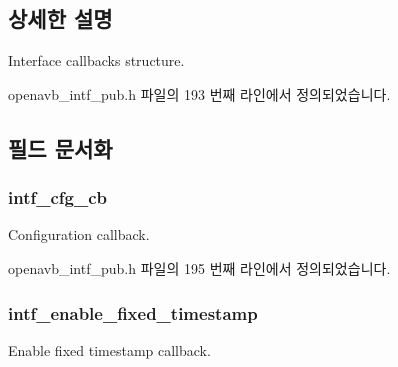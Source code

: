 \subsection{상세한 설명}
Interface callbacks structure. 

openavb\+\_\+intf\+\_\+pub.\+h 파일의 193 번째 라인에서 정의되었습니다.



\subsection{필드 문서화}
\subsubsection[{\texorpdfstring{intf\+\_\+cfg\+\_\+cb}{intf_cfg_cb}}]{ intf\+\_\+cfg\+\_\+cb}\hypertarget{structopenavb__intf__cb__t_ac399da5e32ebb5e311f3c2fefc7c53e2}{}\label{structopenavb__intf__cb__t_ac399da5e32ebb5e311f3c2fefc7c53e2}


Configuration callback. 



openavb\+\_\+intf\+\_\+pub.\+h 파일의 195 번째 라인에서 정의되었습니다.

\subsubsection[{\texorpdfstring{intf\+\_\+enable\+\_\+fixed\+\_\+timestamp}{intf_enable_fixed_timestamp}}]{ intf\+\_\+enable\+\_\+fixed\+\_\+timestamp}\hypertarget{structopenavb__intf__cb__t_a610720587e0f5f8e56e6359b3638cef9}{}\label{structopenavb__intf__cb__t_a610720587e0f5f8e56e6359b3638cef9}


Enable fixed timestamp callback. 



